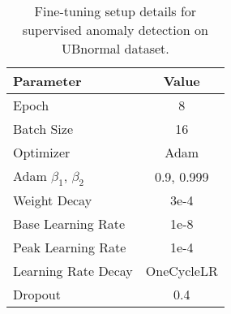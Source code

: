 \begin{table}[h]
    \centering
    \caption{Fine-tuning setup details for supervised anomaly detection on UBnormal \cite{Acsintoae_CVPR_2022} dataset.}
    \begin{tabular}{l c}
        \toprule
        \toprule
        \textbf{Parameter}            & \textbf{Value}                \\ \hline
        Epoch                         & 8                            \\ 
        Batch Size                    & 16                            \\ 
        Optimizer                     & Adam                         \\ 
        Adam \(\beta_1\), \(\beta_2\) & 0.9, 0.999                    \\ 
        Weight Decay                  & 3e-4                          \\ 
        Base Learning Rate             & 1e-8                        \\ 
        Peak Learning Rate             & 1e-4                        \\ 
        Learning Rate Decay           & OneCycleLR \\ 
        Dropout                       & 0.4                           \\ \bottomrule
    \end{tabular}
    \label{tab:extended_fine_tuning_setup_dt4}
\end{table}